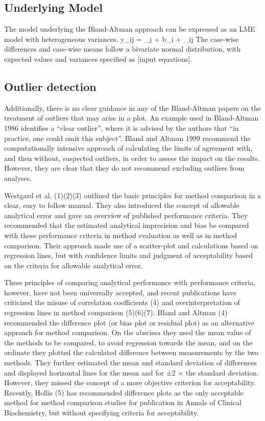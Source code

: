 \subsection{Underlying Model}
The model underlying the Bland-Altman approach can be expressed as an LME model with heterogeneous variances.
y_{ij} = \beta_j + b_i  + \varepsilon_{ij}
The case-wise differences and case-wise means follow a bivariate normal distribution, with expected values and variances specified as [input equations].
\subsection{Outlier detection}
Additionally, there is no clear guidance in any of the Bland-Altman papers on the treatment of outliers that may arise in a plot.
An example used in Bland-Altman 1986 identifies a “clear outlier”, where it is advised by the authors that “in practice, one could omit this subject”.
Bland and Altman 1999 recommend the computationally intensive approach of calculating the limits of agreement with, and then without, suspected outliers, in order to assess the impact on the results. However, they are clear that they do not recommend excluding outliers from analyses.

Westgard et al. (1)(2)(3) outlined the basic principles for method comparison in a clear, easy to follow manual. They also introduced the concept of allowable analytical error and gave an overview of published performance criteria. They recommended that the estimated analytical imprecision and bias be compared with these performance criteria in method evaluation as well as in method comparison. Their approach made use of a scatter-plot and calculations based on regression lines, but with confidence limits and judgment of acceptability based on the criteria for allowable analytical error.

These principles of comparing analytical performance with performance criteria, however, have not been universally accepted, and recent publications have criticized the misuse of correlation coefficients (4) and overinterpretation of regression lines in method comparison (5)(6)(7). Bland and Altman (4) recommended the difference plot (or bias plot or residual plot) as an alternative approach for method comparison. On the abscissa they used the mean value of the methods to be compared, to avoid regression towards the mean, and on the ordinate they plotted the calculated difference between measurements by the two methods. They further estimated the mean and standard deviation of differences and displayed horizontal lines for the mean and for ±2 × the standard deviation. However, they missed the concept of a more objective criterion for acceptability. Recently, Hollis (5) has recommended difference plots as the only acceptable method for method comparison studies for publication in Annals of Clinical Biochemistry, but without specifying criteria for acceptability.

